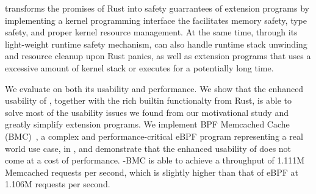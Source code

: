 \projname{} transforms the promises of Rust into safety guarrantees of
    extension programs by implementing a kernel programming interface the
    facilitates memory safety, type safety, and proper kernel resource
    management.
At the same time, through its light-weight runtime safety mechanism,
    \projname{} can also handle runtime stack unwinding and resource cleanup
    upon Rust panics, as well as extension programs that uses a excessive
    amount of kernel stack or executes for a potentially long time.


We evaluate \projname{} on both its usability and performance.
We show that the enhanced usability of \projname{}, together with the rich
    builtin functionalty from Rust, is able to solve most of the usability
    issues we found from our motivational study and greatly simplify extension
    programs.
We implement BPF Memcached Cache (BMC)~\cite{BMC}, a complex and
    performance-critical eBPF program representing a real world use case, in
    \projname{}, and demonstrate that the enhanced usability of \projname{}
    does not come at a cost of performance.
\projname{}-BMC is able to achieve a throughput of 1.111M Memcached requests
    per second, which is slightly higher than that of eBPF at 1.106M requests
    per second.

